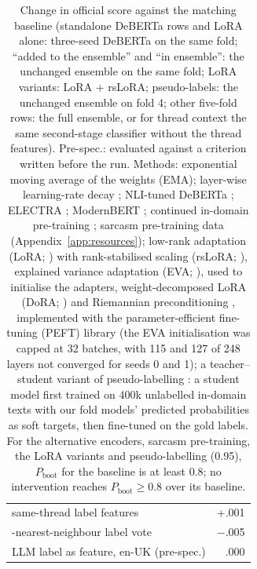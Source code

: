 \documentclass[11pt]{article}
\newcommand{\pboot}{P_{\mathrm{boot}}}
\begin{document}
\begin{table}[!ht]
\begin{tabular}{>{\raggedright\arraybackslash}p{4.85cm}r}
\quad same-thread label features & +.001 \\
\quad 30-nearest-neighbour label vote & $-$.005 \\
\quad LLM label as feature, en-UK (pre-spec.) & .000 \\
\bottomrule
\end{tabular}
\caption{Change in official score against the matching baseline (standalone DeBERTa rows and LoRA alone: three-seed DeBERTa on
the same fold; ``added to the ensemble'' and ``in ensemble'': the unchanged ensemble on the same fold; LoRA variants: LoRA + rsLoRA; pseudo-labels: the unchanged ensemble on fold 4; other five-fold rows: the full ensemble, or for thread context the same
second-stage classifier without the thread features). Pre-spec.: evaluated against a criterion written before the
run. Methods: exponential moving average of the weights (EMA); layer-wise learning-rate decay
\citep{howard-ruder-2018-universal}; NLI-tuned DeBERTa \citep{laurer2024less}; ELECTRA \citep{clark2020electra};
ModernBERT \citep{warner2024modernbert}; continued in-domain pre-training \citep{gururangan-etal-2020-dont}; sarcasm pre-training data (Appendix~\ref{app:resources}); low-rank adaptation (LoRA; \citealp{hu2022lora}) with rank-stabilised scaling (rsLoRA;
\citealp{kalajdzievski2023rslora}), explained variance adaptation (EVA; \citealp{paischer2024eva}), used to
initialise the adapters, weight-decomposed
LoRA (DoRA; \citealp{liu2024dora}) and Riemannian preconditioning \citep{zhang2024riemannian}, implemented with the parameter-efficient
fine-tuning (PEFT) library \citep{peft} (the EVA initialisation was capped at 32 batches, with 115 and 127 of 248 layers not converged for seeds 0 and 1); a teacher--student variant of
pseudo-labelling \citep[cf.][]{lee2013pseudo}: a student model first trained on 400k unlabelled in-domain texts with our
fold models' predicted probabilities as soft targets, then fine-tuned on the gold labels. For the alternative encoders, sarcasm pre-training, the LoRA variants and pseudo-labelling (0.95), $\pboot$ for the
baseline is at least 0.8; no intervention reaches $\pboot\geq0.8$ over its baseline.}
\label{tab:negative}
\end{table}
\end{document}
